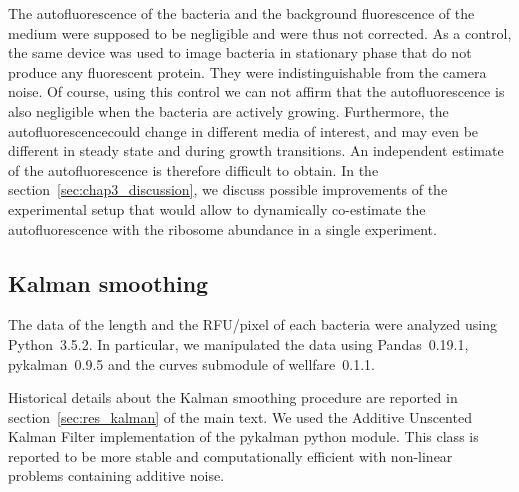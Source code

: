 The autofluorescence of the bacteria and the background fluorescence
of the medium were supposed to be negligible and were thus not corrected.
As a control, the same device was used to image bacteria in stationary
phase that do not produce any fluorescent protein. They were indistinguishable
from the camera noise. Of course, using this control we can not affirm
that the autofluorescence is also negligible when the bacteria are
actively growing. Furthermore, the autofluorescencecould change in
different media of interest, and may even be different in steady state
and during growth transitions. An independent estimate of the autofluorescence
is therefore difficult to obtain. In the section~\ref{sec:chap3_discussion},
we discuss possible improvements of the experimental setup that would
allow to dynamically co-estimate the autofluorescence with the ribosome
abundance in a single experiment.

\subsection{Kalman smoothing}

\label{sec:meth_kalman}

The data of the length and the RFU/pixel of each bacteria were analyzed
using Python~3.5.2. In particular, we manipulated the data using
Pandas~0.19.1, pykalman~0.9.5 and the curves submodule of wellfare~0.1.1.

Historical details about the Kalman smoothing procedure are reported
in section~\ref{sec:res_kalman} of the main text. We used the Additive
Unscented Kalman Filter implementation of the pykalman python module.
This class is reported to be more stable and computationally efficient
with non-linear problems containing additive noise.

